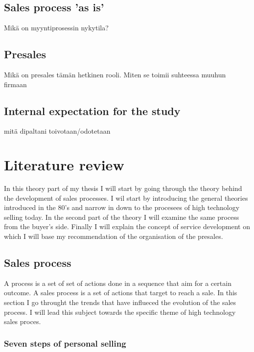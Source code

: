 \documentclass[12pt,a4paper,oneside,pdftex]{report}
\begin{document}
\section{Sales process 'as is'}

Mikä on myyntiprosessin nykytila?

\section{Presales}

Mikä on presales tämän hetkinen rooli. Miten se toimii suhteessa muuhun firmaan

\section{Internal expectation for the study}

mitä dipaltani toivotaan/odotetaan

% 

\chapter{Literature review}
\label{chapter:Theory}


In this theory part of my thesis I will start by going through the theory behind the development of sales processes. I wil start by introducing the general theories introduced in the 80's and narrow in down to the procesees of high technology selling today. 
In the second part of the theory I will examine the same process from the buyer's side. 
Finally I will explain the concept of service development on which I will base my recommendation of the organisation of the presales. 


\section{Sales process}
\label{sec:environments}
A process is a set of set of actions done in a sequence that aim for a certain outcome. A sales process is a set of actions that target to reach a sale. In this section I go throught the trends that have influeced the evolution of the sales process. I will lead this subject towards the specific theme of high technology sales proces.  


\subsection{Seven steps of personal selling}
\end{document}
